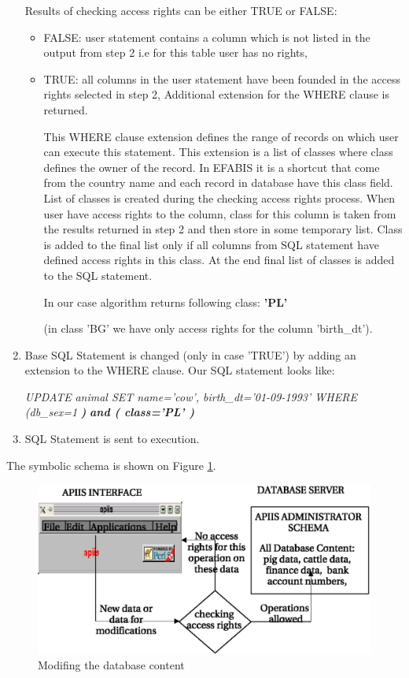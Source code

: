 \begin{enumerate}
Results of checking access rights can be either TRUE or FALSE: 

\begin{itemize}
\item FALSE: user statement contains a column which is not listed in the output from
step 2 i.e for this table user has no rights,
\item TRUE: all columns in the user statement have been founded in the access rights selected in step 2,
Additional extension for the WHERE clause is returned. 


This WHERE clause extension defines the range of records on which
user can execute this statement. This extension is a list of classes where
class defines the owner of the record. In EFABIS it is a shortcut that come from the country name and
each record in database have this class field.
List of classes is created during the checking access rights process. When user have access rights to the column,
class for this column is taken from the results returned in step 2 and then store in some temporary list. 
Class is added to the final list only if all columns from SQL statement have defined
access rights in this class. At the end final list of classes is added to the SQL statement.

In our case algorithm returns following class: \textbf{'PL' }

(in class 'BG' we have only access rights for the column 'birth\_dt').

\end{itemize}
\item Base SQL Statement is changed (only in case 'TRUE') by adding an
extension to the WHERE clause. Our SQL statement looks like:


\medskip{}
\begin{center}\emph{UPDATE} \emph{animal SET name='cow',
birth\_dt='01-09-1993' WHERE} \emph{(db\_sex=1} \textbf{\emph{)}} 
\textbf{\emph{and ( class='PL' )}}\end{center}
\medskip{}

\item SQL Statement is sent to execution.
\end{enumerate}
The symbolic schema is shown on Figure \ref{fig:modifingdata}.
\begin{figure}[h]
\begin{center}
   \includegraphics[scale=1]{./access-control/modifingdata.eps}
   \caption{Modifing the database content}
   \label{fig:modifingdata}
\end{center}
\end{figure}


